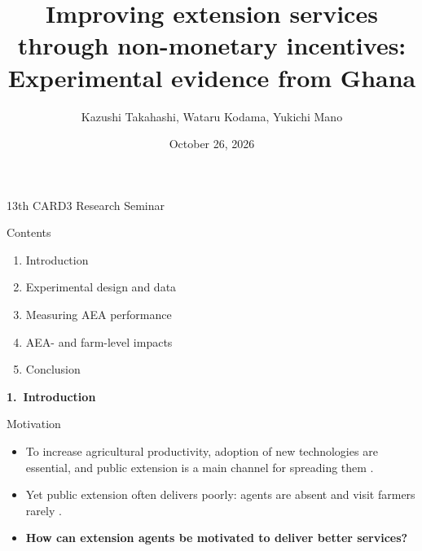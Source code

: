 \documentclass[aspectratio=169]{beamer}
\title[Improving extension services]{Improving extension services through non-monetary incentives: Experimental evidence from Ghana}
\author[Takahashi et al.]{Kazushi Takahashi, Wataru Kodama, Yukichi Mano}
\date{October 26, 2026}
\newcommand{\footsec}{}
\begin{document}
\begin{frame}[noframenumbering]{}
		\titlepage
        \centering
        13th CARD3 Research Seminar
	\end{frame}

\begin{frame}{Contents}
	\begin{enumerate}
		\item Introduction
		\item Experimental design and data
		\item Measuring AEA performance
		\item AEA- and farm-level impacts
		\item Conclusion
	\end{enumerate}
\end{frame}

\renewcommand{\footsec}{1.~Introduction}
\begin{frame}
	\vfill
	\centering
	{\Huge\bfseries\textcolor{myGreen}{1.~Introduction}}
	\vfill
\end{frame}

\begin{frame}{Motivation}
	\begin{itemize}
		\item To increase agricultural productivity, adoption of new technologies are essential, and public extension is a main channel for spreading them \citep{takahashi_technology_2020}.
		\vspace{0.35cm}
		\item Yet public extension often delivers poorly: agents are absent and visit farmers rarely \citep{anderson_chapter_2007, alam_incentives_2024}.
		\vspace{0.35cm}
		\item \textbf{How can extension agents be motivated to deliver better services?}
	\end{itemize}
\end{frame}
\end{document}
